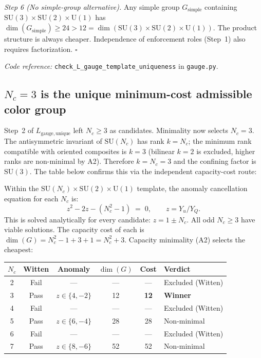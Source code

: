 \documentclass[11pt]{article}
\newcommand{\coderef}[2]{\smallskip\noindent\textit{Code reference:} \texttt{#1} in \texttt{#2}.}
\newcommand{\SU}{\mathrm{SU}}
\newcommand{\U}{\mathrm{U}}
\begin{document}
\begin{tcolorbox}[apfbox, title={Lemma $L_{\mathrm{gauge,unique}}$ (Gauge Template Uniqueness)}]
\medskip\noindent\textit{Step 6 (No simple-group alternative).}  Any simple group $G_{\mathrm{simple}}$ containing $\SU(3) \times \SU(2) \times \U(1)$ has $\dim(G_{\mathrm{simple}}) \ge 24 > 12 = \dim(\SU(3) \times \SU(2) \times \U(1))$.  The product structure is always cheaper.  Independence of enforcement roles (Step~1) also requires factorization.  $\square$

\coderef{check\_L\_gauge\_template\_uniqueness}{gauge.py}
\end{tcolorbox}

\subsection{$N_c = 3$ is the unique minimum-cost admissible color group}

Step~2 of $L_{\mathrm{gauge,unique}}$ left $N_c \ge 3$ as candidates.  Minimality now selects $N_c = 3$.  The antisymmetric invariant of $\SU(N_c)$ has rank $k = N_c$; the minimum rank compatible with oriented composites is $k = 3$ (bilinear $k=2$ is excluded, higher ranks are non-minimal by A2).  Therefore $k = N_c = 3$ and the confining factor is $\SU(3)$.  The table below confirms this via the independent capacity-cost route:

Within the $\SU(N_c) \times \SU(2) \times \U(1)$ template, the anomaly cancellation equation for each $N_c$ is:
\begin{equation}
z^2 - 2z - (N_c^2 - 1) \;=\; 0, \qquad z = Y_u / Y_Q.
\label{eq:anomaly_cancel}
\end{equation}
This is solved analytically for every candidate: $z = 1 \pm N_c$.  All odd $N_c \ge 3$ have viable solutions.  The capacity cost of each is $\dim(G) = N_c^2 - 1 + 3 + 1 = N_c^2 + 3$.  Capacity minimality (A2) selects the cheapest:

\begin{center}
\small
\begin{tabular}{cccccl}
\toprule
$N_c$ & Witten & Anomaly & $\dim(G)$ & Cost & Verdict \\
\midrule
2 & Fail & --- & --- & --- & Excluded (Witten) \\
3 & Pass & $z \in \{4, -2\}$ & 12 & \textbf{12} & \textbf{Winner} \\
4 & Fail & --- & --- & --- & Excluded (Witten) \\
5 & Pass & $z \in \{6, -4\}$ & 28 & 28 & Non-minimal \\
6 & Fail & --- & --- & --- & Excluded (Witten) \\
7 & Pass & $z \in \{8, -6\}$ & 52 & 52 & Non-minimal \\
\bottomrule
\end{tabular}
\end{center}
\end{document}
